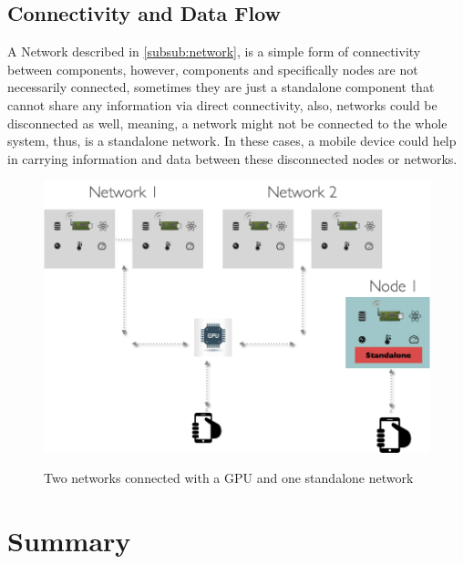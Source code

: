 \subsection{Connectivity and Data Flow}
A Network described in \ref{subsub:network}, is a simple form of connectivity between components, however, components and specifically nodes are not necessarily connected, sometimes they are just a standalone component that cannot share any information via direct connectivity, also, networks could be disconnected as well, meaning, a network might not be connected to the whole system, thus, is a standalone network. In these cases, a mobile device could help in carrying information and data between these disconnected nodes or networks. 

\begin{figure}[H]
	\centering
	\includegraphics[scale=0.5]{images/system.png}
	\label{fig:system}
	\caption{Two networks connected with a GPU and one standalone network}
\end{figure}









\section{Summary}



